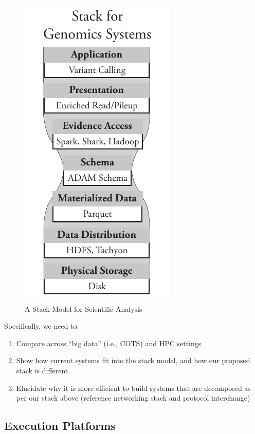 \documentclass{acm_proc_article-sp}
\begin{document}
\begin{figure}[h]
\begin{center}
\includegraphics[width=0.6\linewidth]{stack-model.pdf}
\end{center}
\caption{A Stack Model for Scientific Analysis}
\label{fig:stack-model}
\end{figure}

Specifically, we need to:

\begin{enumerate}
\item Compare across ``big data'' (i.e., COTS) and HPC settings
\item Show how current systems fit into the stack model, and how our proposed stack is different
\item Elucidate why it is more efficient to build systems that are decomposed as per our stack above
(reference networking stack and protocol interchange)
\end{enumerate}

\subsection{Execution Platforms}
\label{sec:execution-platforms}
\end{document}
